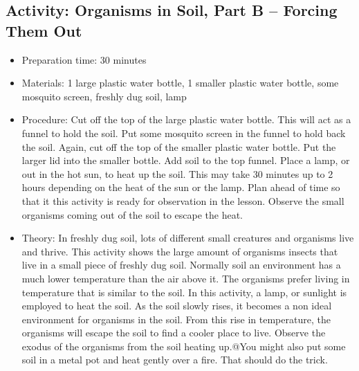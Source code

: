 \subsection{Activity: Organisms in Soil, Part B – Forcing Them Out}
\begin{itemize}
\item{Preparation time: 30 minutes}
\item{Materials: 1 large plastic water bottle, 1 smaller plastic water bottle, some mosquito screen, freshly dug soil, lamp}
\item{Procedure: Cut off the top of the large plastic water bottle. This will act as a funnel to hold the soil. Put some mosquito screen in the funnel to hold back the soil. Again, cut off the top of the smaller plastic water bottle. Put the larger lid into the smaller bottle. Add soil to the top funnel. Place a lamp, or out in the hot sun, to heat up the soil. This may take 30 minutes up to 2 hours depending on the heat of the sun or the lamp. Plan ahead of time so that it this activity is ready for observation in the lesson. Observe the small organisms coming out of the soil to escape the heat.}
\item{Theory: In freshly dug soil, lots of different small creatures and organisms live and thrive. This activity shows the large amount of organisms insects that live in a small piece of freshly dug soil. Normally soil an environment has a much lower temperature than the air above it. The organisms prefer living in temperature that is similar to the soil. In this activity, a lamp, or sunlight is employed to heat the soil. As the soil slowly rises, it becomes a non ideal environment for organisms in the soil. From this rise in temperature, the organisms will escape the soil to find a cooler place to live. Observe the exodus of the organisms from the soil heating up.@You might also put some soil in a metal pot and heat gently over a fire. That should do the trick.}
\end{itemize}

